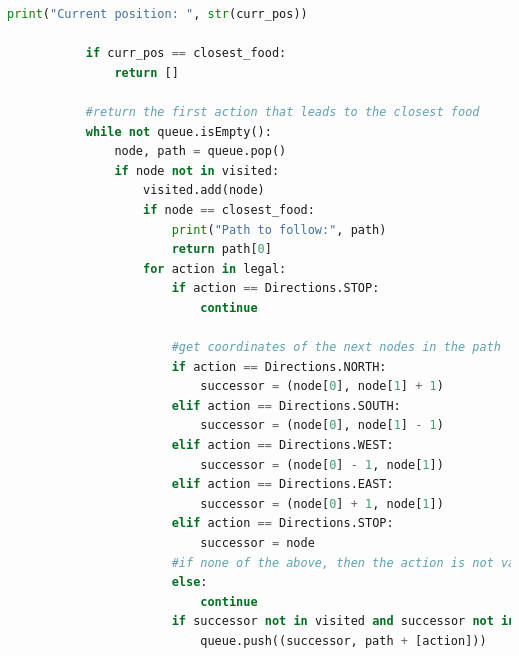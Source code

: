 \documentclass{article}
\begin{document}
\begin{lstlisting}[language=Python, caption=The HybridAgent class]
	       print("Current position: ", str(curr_pos))
	
	       if curr_pos == closest_food:
	           return []
	
	       #return the first action that leads to the closest food
	       while not queue.isEmpty():
	           node, path = queue.pop()
	           if node not in visited:
	               visited.add(node)
	               if node == closest_food:
	                   print("Path to follow:", path)
	                   return path[0]
	               for action in legal:
 	                   if action == Directions.STOP:
	                       continue
	
	                   #get coordinates of the next nodes in the path
	                   if action == Directions.NORTH:
	                       successor = (node[0], node[1] + 1)
	                   elif action == Directions.SOUTH:
	                       successor = (node[0], node[1] - 1)
	                   elif action == Directions.WEST:
	                       successor = (node[0] - 1, node[1])
	                   elif action == Directions.EAST:
	                       successor = (node[0] + 1, node[1])
	                   elif action == Directions.STOP:
	                       successor = node
	                   #if none of the above, then the action is not valid
	                   else:
	                       continue
	                   if successor not in visited and successor not in walls:
	                       queue.push((successor, path + [action]))
	 

\end{lstlisting}
\end{document}
